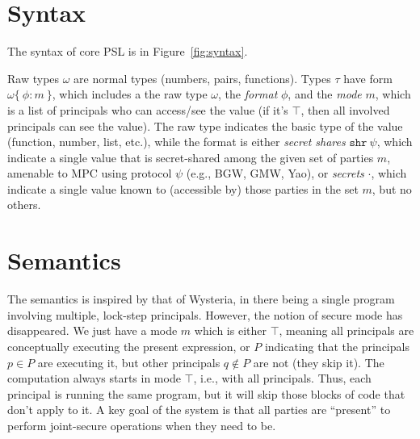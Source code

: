 \documentclass[10pt]{article}
\newcommand{\ssec}{\ensuremath{\mathtt{\cdot}}}
\newcommand{\isec}{\ensuremath{\mathtt{pmap}}}
\newcommand{\sshare}[1]{\ensuremath{\mathtt{shr}~{#1}}}
\newcommand{\sectyp}[3]{\ensuremath{{#1} \{~{#2}:{#3}~\}}}
\newcommand{\mwh}[1]{\textcolor{red}{Mike: #1}}
\begin{document}
\section{Syntax}
  
The syntax of core PSL is in Figure~\ref{fig:syntax}.

Raw types $\omega$ are normal types (numbers, pairs, functions). Types
$\tau$ have form $\sectyp{\omega}{\phi}{m}$, which includes a the raw
type $\omega$, the \emph{format} $\phi$, and the \emph{mode}
$m$, which is a list of principals who can access/see the value (if
it's $\top$, then all involved principals can see the value). The raw
type indicates the basic type of the value (function, number, list,
etc.), while the format is either \emph{secret shares} $\sshare\psi$,
which indicate a single value that is secret-shared among the given
set of parties $m$, amenable to MPC using protocol $\psi$ (e.g., BGW,
GMW, Yao), or \emph{secrets} \ssec, which indicate a single value
known to (accessible by) those parties in the set $m$, but no others.



\section{Semantics}

The semantics is inspired by that of Wysteria, in there being a single
program involving multiple, lock-step principals. However, the notion
of secure mode has disappeared. We just have a mode $m$ which is
either $\top$, meaning all principals are conceptually executing the
present expression, or $P$ indicating that the principals
$p \in P$ are executing it, but other principals $q \not\in P$ are not
(they skip it). The computation always starts in mode $\top$, i.e.,
with all principals. Thus, each principal is running the same program,
but it will skip those blocks of code that don't apply to it.  A key
goal of the system is that all parties are ``present'' to perform
joint-secure operations when they need to be.
\end{document}
